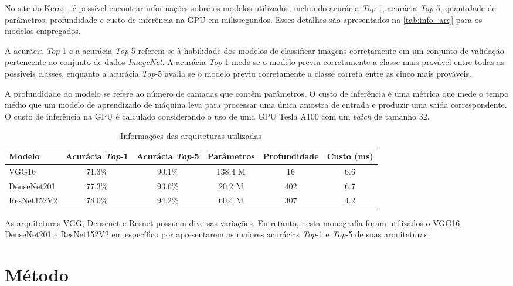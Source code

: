 No site do Keras \cite{chollet2015keras}, é possível encontrar informações sobre os modelos utilizados, incluindo acurácia \textit{Top}-1, acurácia \textit{Top}-5, quantidade de parâmetros, profundidade e custo de inferência na GPU em milissegundos. 
Esses detalhes são apresentados na \autoref{tab:info_arq} para os modelos empregados.

A acurácia \textit{Top}-1 e a acurácia \textit{Top}-5 referem-se à habilidade dos modelos de classificar imagens corretamente em um conjunto de validação pertencente ao conjunto de dados \textit{ImageNet}. 
A acurácia \textit{Top}-1 mede se o modelo previu corretamente a classe mais provável entre todas as possíveis classes, enquanto a acurácia \textit{Top}-5 avalia se o modelo previu corretamente a classe correta entre as cinco mais prováveis.

A profundidade do modelo se refere ao número de camadas que contêm parâmetros. 
O custo de inferência é uma métrica que mede o tempo médio que um modelo de aprendizado de máquina leva para processar uma única amostra de entrada e produzir uma saída correspondente. 
O custo de inferência na GPU é calculado considerando o uso de uma GPU Tesla A100 com um \textit{batch} de tamanho 32.

\begin{table}[htb]
\centering
\caption{Informações das arquiteturas utilizadas}
\label{tab:info_arq}
\begin{tabularx}{\textwidth}{l|c|c|c|c|c} \hline
Modelo & Acurácia \textit{Top}-1 & Acurácia \textit{Top}-5 & Parâmetros & Profundidade & Custo (ms)\\ \hline \hline
VGG16 & 71.3\% & 90.1\% & 138.4 M & 16 & 6.6\\ \hline
DenseNet201 & 77.3\% & 93.6\% & 20.2 M & 402 & 6.7\\ \hline
ResNet152V2 & 78.0\% & 94,2\% & 60.4 M & 307 & 4.2\\ \hline
\end{tabularx}
\end{table}

As arquiteturas VGG, Densenet e Resnet possuem diversas variações.
Entretanto, nesta monografia foram utilizados o VGG16, DenseNet201 e ResNet152V2 em específico por apresentarem as maiores acurácias \textit{Top}-1 e \textit{Top}-5 de suas arquiteturas.


\section{Método}

